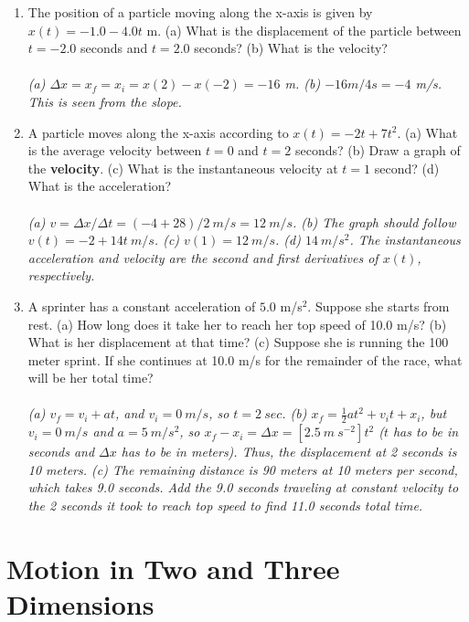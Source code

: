 \documentclass[10pt]{article}
\begin{document}
\begin{enumerate}
\item The position of a particle moving along the x-axis is given by $x(t) = -1.0 - 4.0t$ m. (a) What is the displacement of the particle between $t=-2.0$ seconds and $t=2.0$ seconds?  (b) What is the velocity? \\ \\
\textit{(a) $\Delta x = x_f = x_i = x(2) - x(-2) = -16$ m. (b) $-16 m / 4 s = -4$ m/s.  This is seen from the slope.}
\item A particle moves along the x-axis according to $x(t) = -2t + 7t^2$.  (a) What is the average velocity between $t=0$ and $t=2$ seconds?  (b) Draw a graph of the \textbf{velocity}.  (c) What is the instantaneous velocity at $t=1$ second?  (d) What is the acceleration? \\ \\
\textit{(a) $v = \Delta x / \Delta t = (-4 + 28)/2~m/s = 12~m/s$. (b) The graph should follow $v(t) = -2+14t~m/s$. (c) $v(1) = 12~m/s$. (d) $14~m/s^2$.  The instantaneous acceleration and velocity are the second and first derivatives of $x(t)$, respectively.}
\item A sprinter has a constant acceleration of $5.0$ m/s$^2$.  Suppose she starts from rest.  (a) How long does it take her to reach her top speed of 10.0 m/s? (b) What is her displacement at that time?  (c) Suppose she is running the 100 meter sprint.  If she continues at 10.0 m/s for the remainder of the race, what will be her total time? \\ \\
\textit{(a) $v_f = v_i + a t$, and $v_i = 0~m/s$, so $t = 2~sec$. (b) $x_f = \frac{1}{2} a t^2 + v_i t + x_i$, but $v_i = 0 ~m/s$ and $a = 5~m/s^2$, so $x_f - x_i = \Delta x = [2.5 ~m ~s^{-2}] t^2$ ($t$ has to be in seconds and $\Delta x$ has to be in meters).  Thus, the displacement at 2 seconds is 10 meters. (c) The remaining distance is 90 meters at 10 meters per second, which takes 9.0 seconds.  Add the 9.0 seconds traveling at constant velocity to the 2 seconds it took to reach top speed to find 11.0 seconds total time.}
\end{enumerate}

\section{Motion in Two and Three Dimensions}
\end{document}
